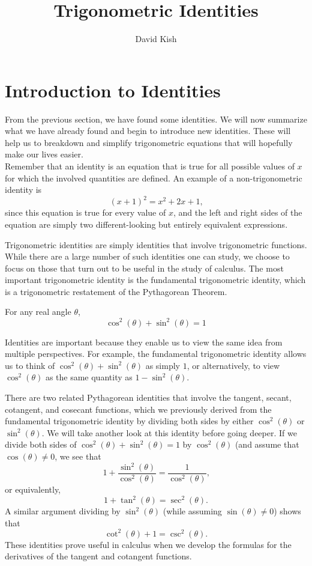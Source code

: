 \documentclass{ximera}
\author{David Kish}
\title{Trigonometric Identities}
\begin{document}
\begin{abstract}
  
\end{abstract}
\maketitle

\section{Introduction to Identities}
From the previous section, we have found some identities. We will now summarize what we have already found and begin to introduce new identities. These will help us to breakdown and simplify trigonometric equations that will hopefully make our lives easier.\\

Remember that an identity is an equation that is true for all possible values of \(x\) for which the involved quantities are defined.  An example of a non-trigonometric identity is%
\[
(x+1)^2 = x^2 + 2x + 1\text{,}
\]
since this equation is true for every value of \(x\), and the left and right sides of the equation are simply two different-looking but entirely equivalent expressions.%

Trigonometric identities are simply identities that involve trigonometric functions.  While there are a large number of such identities one can study, we choose to focus on those that turn out to be useful in the study of calculus.  The most important trigonometric identity is the fundamental trigonometric identity, which is a trigonometric restatement of the Pythagorean Theorem.%

For any real angle \(\theta\),%
\[
\cos^2(\theta) + \sin^2(\theta) = 1
\]
%

Identities are important because they enable us to view the same idea from multiple perspectives.  For example, the fundamental trigonometric identity allows us to think of \(\cos^2(\theta) + \sin^2(\theta)\) as simply \(1\), or alternatively, to view \(\cos^2(\theta)\) as the same quantity as \(1 - \sin^2(\theta)\).%

There are two related Pythagorean identities that involve the tangent, secant, cotangent, and cosecant functions, which we previously derived from the fundamental trigonometric identity by dividing both sides by either \(\cos^2(\theta)\) or \(\sin^2(\theta)\).  We will take another look at this identity before going deeper. If we divide both sides of $\cos^2(\theta) + \sin^2(\theta) = 1$ by \(\cos^2(\theta)\) (and assume that \(\cos(\theta) \ne 0\), we see that%
\[
1 + \frac{\sin^2(\theta)}{\cos^2(\theta)} = \frac{1}{\cos^2(\theta)} \text{,}
\]
or equivalently,%
\[
1 + \tan^2(\theta) = \sec^2(\theta) \text{.}
\]
A similar argument dividing by \(\sin^2(\theta)\) (while assuming \(\sin(\theta) \ne 0\)) shows that%
\[
\cot^2(\theta) + 1 = \csc^2(\theta) \text{.}
\]
These identities prove useful in calculus when we develop the formulas for the derivatives of the tangent and cotangent functions.%
\end{document}
